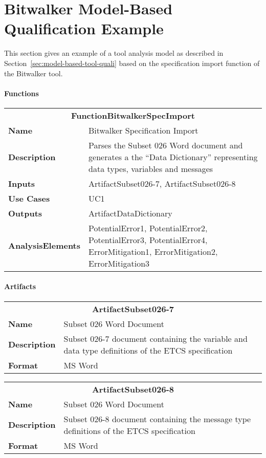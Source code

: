 \newpage
\section{Bitwalker Model-Based Qualification Example}
\label{sec:bitwalker-example}

This section gives an example of a tool analysis model as described in Section~\ref{sec:model-based-tool-quali} based on the specification import function of the Bitwalker tool.
\paragraph{Functions}

\begin{tabular}{|lp{}|}
\hline
\multicolumn{2}{|c|}{\bf FunctionBitwalkerSpecImport}\\
\bf Name& Bitwalker Specification Import\\
\bf Description&Parses the Subset 026 Word document and generates a the ``Data Dictionary'' representing data types, variables and messages\\
\bf Inputs&ArtifactSubset026-7, ArtifactSubset026-8\\
\bf Use Cases&UC1\\
\bf Outputs&ArtifactDataDictionary\\
\bf AnalysisElements&PotentialError1, PotentialError2, PotentialError3, PotentialError4, ErrorMitigation1, ErrorMitigation2, ErrorMitigation3\\
\hline
\end{tabular}

\paragraph{Artifacts}

\begin{tabular}{|lp{}|}
\hline
\multicolumn{2}{|c|}{\bf ArtifactSubset026-7}\\
\bf Name& Subset 026 Word Document\\
\bf Description&Subset 026-7 document containing the variable and data type definitions of the ETCS specification\\
\bf Format&MS Word\\
\hline
\end{tabular}


\begin{tabular}{|lp{}|}
\hline
\multicolumn{2}{|c|}{\bf ArtifactSubset026-8}\\
\bf Name& Subset 026 Word Document\\
\bf Description&Subset 026-8 document containing the message type definitions of the ETCS specification\\
\bf Format&MS Word\\
\hline
\end{tabular}

